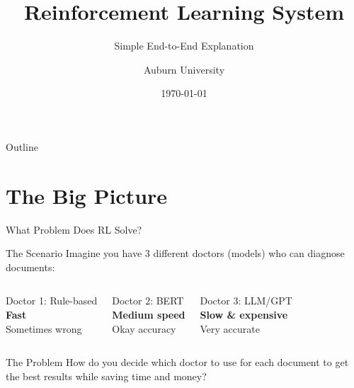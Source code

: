 \documentclass[aspectratio=169]{beamer}
\title[RL System Explained]{Reinforcement Learning System}
\subtitle{Simple End-to-End Explanation}
\author{Auburn University}
\institute{Enterprise Data Ingestion Platform}
\date{\today}
\begin{document}
\begin{frame}
\titlepage
\end{frame}

\begin{frame}{Outline}
\tableofcontents
\end{frame}

\section{The Big Picture}

\begin{frame}{What Problem Does RL Solve?}
\begin{block}{The Scenario}
Imagine you have 3 different doctors (models) who can diagnose documents:
\end{block}

\vspace{0.5cm}

\begin{columns}[T]
\begin{alertblock}{Doctor 1: Rule-based}
\centering
\faUserMd \\
\textbf{Fast} \\
Sometimes wrong
\end{alertblock}

\begin{block}{Doctor 2: BERT}
\centering
\faRobot \\
\textbf{Medium speed} \\
Okay accuracy
\end{block}

\begin{exampleblock}{Doctor 3: LLM/GPT}
\centering
\faBrain \\
\textbf{Slow \& expensive} \\
Very accurate
\end{exampleblock}
\end{columns}

\vspace{0.5cm}

\begin{alertblock}{The Problem}
\centering
How do you decide which doctor to use for each document to get the best results while saving time and money?
\end{alertblock}
\end{frame}
\end{document}
